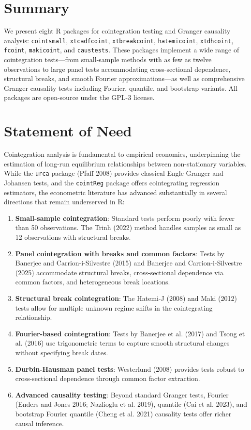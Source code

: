\section{Summary}\label{summary}

We present eight R packages for cointegration testing and Granger
causality analysis: \texttt{cointsmall}, \texttt{xtcadfcoint},
\texttt{xtbreakcoint}, \texttt{hatemicoint}, \texttt{xtdhcoint},
\texttt{fcoint}, \texttt{makicoint}, and \texttt{caustests}. These
packages implement a wide range of cointegration tests---from
small-sample methods with as few as twelve observations to large panel
tests accommodating cross-sectional dependence, structural breaks, and
smooth Fourier approximations---as well as comprehensive Granger
causality tests including Fourier, quantile, and bootstrap variants. All
packages are open-source under the GPL-3 license.

\section{Statement of Need}\label{statement-of-need}

Cointegration analysis is fundamental to empirical economics,
underpinning the estimation of long-run equilibrium relationships
between non-stationary variables. While the \texttt{urca} package (Pfaff
2008) provides classical Engle-Granger and Johansen tests, and the
\texttt{cointReg} package offers cointegrating regression estimators,
the econometric literature has advanced substantially in several
directions that remain underserved in R:

\begin{enumerate}
\def\labelenumi{\arabic{enumi}.}
\tightlist
\item
  \textbf{Small-sample cointegration}: Standard tests perform poorly
  with fewer than 50 observations. The Trinh (2022) method handles
  samples as small as 12 observations with structural breaks.
\item
  \textbf{Panel cointegration with breaks and common factors}: Tests by
  Banerjee and Carrion-i-Silvestre (2015) and Banerjee and
  Carrion-i-Silvestre (2025) accommodate structural breaks,
  cross-sectional dependence via common factors, and heterogeneous break
  locations.
\item
  \textbf{Structural break cointegration}: The Hatemi-J (2008) and Maki
  (2012) tests allow for multiple unknown regime shifts in the
  cointegrating relationship.
\item
  \textbf{Fourier-based cointegration}: Tests by Banerjee et al. (2017)
  and Tsong et al. (2016) use trigonometric terms to capture smooth
  structural changes without specifying break dates.
\item
  \textbf{Durbin-Hausman panel tests}: Westerlund (2008) provides tests
  robust to cross-sectional dependence through common factor extraction.
\item
  \textbf{Advanced causality testing}: Beyond standard Granger tests,
  Fourier (Enders and Jones 2016; Nazlioglu et al. 2019), quantile (Cai
  et al. 2023), and bootstrap Fourier quantile (Cheng et al. 2021)
  causality tests offer richer causal inference.
\end{enumerate}

